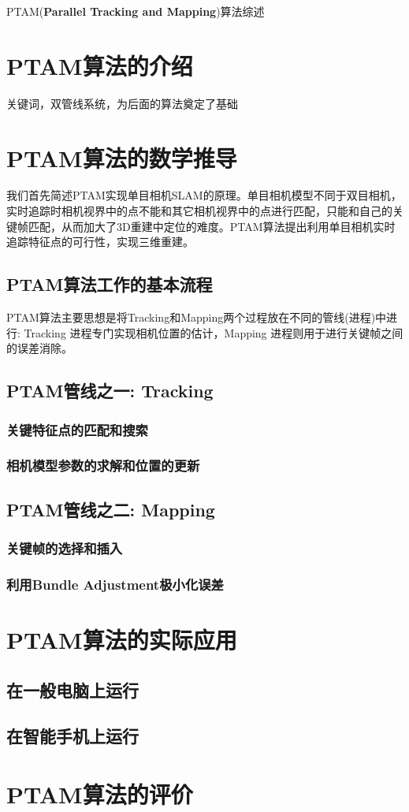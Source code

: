 \documentclass[12pt]{article}
\begin{document}
\begin{center}
PTAM(\textbf{Parallel Tracking and Mapping})算法综述
\end{center}
\section{PTAM算法的介绍}
关键词，双管线系统，为后面的算法奠定了基础

\section{PTAM算法的数学推导}
我们首先简述PTAM实现单目相机SLAM的原理。单目相机模型不同于双目相机，实时追踪时相机视界中的点不能和其它相机视界中的点进行匹配，只能和自己的关键帧匹配，从而加大了3D重建中定位的难度。PTAM算法提出利用单目相机实时追踪特征点的可行性，实现三维重建。

\subsection{PTAM算法工作的基本流程}
PTAM算法主要思想是将Tracking和Mapping两个过程放在不同的管线(进程)中进行: Tracking 进程专门实现相机位置的估计，Mapping 进程则用于进行关键帧之间的误差消除。

\subsection{PTAM管线之一: Tracking}


\subsubsection{关键特征点的匹配和搜索}

\subsubsection{相机模型参数的求解和位置的更新}


\subsection{PTAM管线之二: Mapping}

\subsubsection{关键帧的选择和插入}

\subsubsection{利用Bundle Adjustment极小化误差}


\section{PTAM算法的实际应用}
\subsection{在一般电脑上运行}
\subsection{在智能手机上运行}

\section{PTAM算法的评价}
\end{document}
